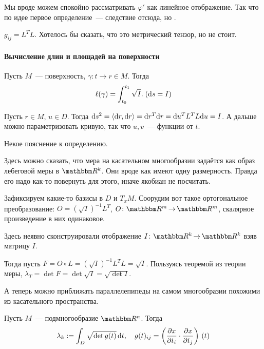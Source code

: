 \documentclass[draft,timbord]{longnotes}
\begin{document}
Мы вроде можем спокойно рассматривать $\varphi'$ как линейное отображение.
Так что по идее первое определение~--- следствие отсюда, но \quest.

\begin{defn}\label{defn:dg::tangentbndl::gram}
  $g_{ij} = L^T L$. Хотелось бы сказать, что это метрический тензор, но не стоит.
\end{defn}

\paragraph{Вычисление длин и площадей на поверхности}
\label{par:dg::area}

\begin{thrm}\label{thrm:dg::area::len}
  Пусть $M$~--- поверхность, $\gamma \colon t \to r \in M$.
  Тогда \[
    \ell(\gamma)= \displaystyle\int_{t_0}^{t_1} \sqrt I.\; (\mathrm{d} s = I)
  \]
\end{thrm}
\begin{tproof}
  Пусть $r \in M$, $u \in D$. Тогда
  $\mathrm{d} s^2 = \langle \mathrm{d} r, \mathrm{d} r \rangle = \mathrm{d} r ^T \mathrm{d} r = \mathrm{d} u^T L^T L \mathrm{d} u = I$.
  А дальше можно параметризовать кривую, так что $u,v$~--- функции от $t$. 
\end{tproof}


Некое пояснение к определению.

Здесь можно сказать, что  мера на касательном многообразии
задаётся как образ лебеговой меры в $\R^k$.
Они вроде как имеют одну размерность.
Правда его надо как-то повернуть для этого, иначе якобиан не посчитать.

Зафиксируем какие-то базисы в $D$ и $T_xM$.
Соорудим вот такое ортогональное преобразование: $O = \left(\sqrt{I}\right)^{-1} L^T$,
$O \colon \R^m \to \R^m$, скалярное произведение в них одинаковое.

Здесь неявно сконструировали отображение $I\colon \R^k \to \R^k$ взяв матрицу $I$.

Тогда пусть $F = O \circ L = \left(\sqrt{I}\right)^{-1} L^T L = \sqrt{I}$.
Пользуясь теоремой из теории меры, $\lambda_T = \det F = \det \sqrt I = \sqrt {\det I}$.


А теперь можно приближать параллелепипеды на самом многообразии
похожими из касательного пространства.


\begin{defn}\label{thrm:dg::area::manifold}
  Пусть $M$~--- подмногообразие $\R^n$.  Тогда 
  \[
      \lambda_k := \int _D \sqrt {\det g(t)} \, \mathrm{d} t, \quad
      g(t)_{ij} = \left(\frac{\partial x}{\partial t_i} \cdot \frac{\partial x}{\partial t_j}\right)\, (t)
  \]
\end{defn}
\end{document}
